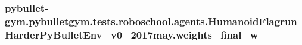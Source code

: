 \subsubsection[{\texorpdfstring{weights\+\_\+final\+\_\+w}{weights_final_w}}]{\setlength{\rightskip}{0pt plus 5cm}pybullet-\/gym.\+pybulletgym.\+tests.\+roboschool.\+agents.\+Humanoid\+Flagrun\+Harder\+Py\+Bullet\+Env\+\_\+v0\+\_\+2017may.\+weights\+\_\+final\+\_\+w}\hypertarget{namespacepybullet-gym_1_1pybulletgym_1_1tests_1_1roboschool_1_1agents_1_1_humanoid_flagrun_harder_py_bullet_env__v0__2017may_a1cc97c6e322e90102f52980eb9697f0e}{}\label{namespacepybullet-gym_1_1pybulletgym_1_1tests_1_1roboschool_1_1agents_1_1_humanoid_flagrun_harder_py_bullet_env__v0__2017may_a1cc97c6e322e90102f52980eb9697f0e}
